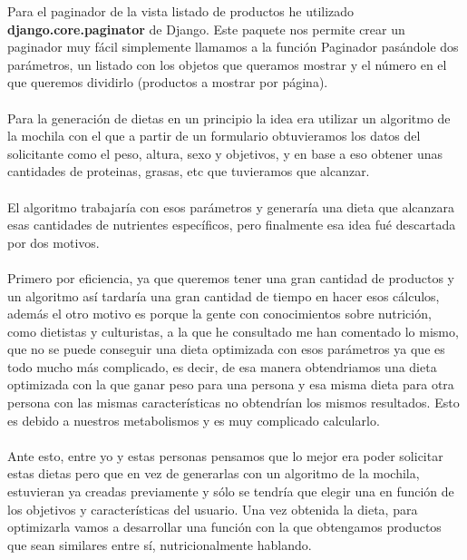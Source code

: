 Para el paginador de la vista listado de productos he utilizado \textbf{django.core.paginator} de Django. Este paquete nos permite crear 
un paginador muy fácil simplemente llamamos a la función Paginador pasándole dos parámetros, un listado con los objetos que 
queramos mostrar y el número en el que queremos dividirlo (productos a mostrar por página). \\ \\

Para la generación de dietas en un principio la idea era utilizar un algoritmo de la mochila con el que a partir de un formulario obtuvieramos los datos del solicitante
como el peso, altura, sexo y objetivos, y en base a eso obtener unas cantidades de proteinas, grasas, etc que tuvieramos que alcanzar.\\ \\

El algoritmo trabajaría con esos parámetros y generaría una dieta que alcanzara esas cantidades de nutrientes específicos, pero finalmente esa idea fué descartada por dos motivos.\\\\

Primero por eficiencia, ya que queremos tener una gran cantidad de productos y un algoritmo así tardaría una gran cantidad de tiempo en hacer esos cálculos, además el otro motivo es 
porque la gente con conocimientos sobre nutrición, como dietistas y culturistas, a la que he consultado me han comentado lo mismo, que no se puede conseguir una dieta optimizada con esos 
parámetros ya que es todo mucho más complicado, es decir, de esa manera obtendriamos una dieta optimizada con la que ganar peso para una persona y esa misma dieta para otra persona con 
las mismas características no obtendrían los mismos resultados. Esto es debido a nuestros metabolismos y es muy complicado calcularlo.\\\\

Ante esto, entre yo y estas personas pensamos que lo mejor era poder solicitar estas dietas pero que en vez de generarlas con un algoritmo de la mochila, estuvieran ya creadas previamente
y sólo se tendría que elegir una en función de los objetivos y características del usuario. Una vez obtenida la dieta, para optimizarla vamos a desarrollar una función con la que 
obtengamos productos que sean similares entre sí, nutricionalmente hablando.\\\\


